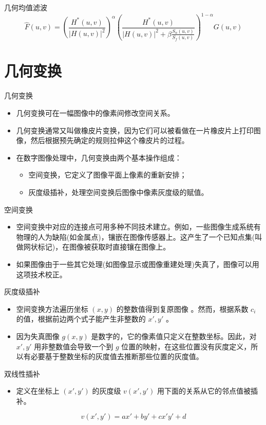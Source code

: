\documentclass[presentation]{beamer}
\begin{document}
\begin{frame}[label={sec:org3183fc2}]{几何均值滤波}
\[ \hat F(u,v) =\left(\frac{H^{*}(u,v)}{|H(u,v)|^2}\right)^{\alpha}\left(\frac{H^{ *}(u,v)}{|H(u,v)|^2+\beta \frac{S_n(u,v)}{S_f(u,v)}}\right)^{1-\alpha}G(u,v) \]
\end{frame}

\section{几何变换}
\label{sec:org457576d}
\begin{frame}[label={sec:org7e2612c}]{几何变换}
\begin{itemize}
\item 几何变换可在一幅图像中的像素间修改空间关系。
\item 几何变换通常又叫做橡皮片变换，因为它们可以被看做在一片橡皮片上打印图像，然后根据预先确定的规则拉伸这个橡皮片的过程。
\item 在数字图像处理中，几何变换由两个基本操作组成：
\begin{itemize}
\item 空间变换，它定义了图像平面上像素的重新安排；
\item 灰度级插补，处理空间变换后图像中像素灰度级的赋值。
\end{itemize}
\end{itemize}
\end{frame}

\begin{frame}[label={sec:org503f0c9}]{空间变换}
\begin{itemize}
\item 空间变换中对应的连接点可用多种不同技术建立。例如，一些图像生成系统有物理的人为缺陷(如金属点)，镶嵌在图像传感器上。这产生了一个已知点集(叫做网状标记)，在图像被获取时直接镶在图像上。
\item 如果图像由于一些其它处理(如图像显示或图像重建处理)失真了，图像可以用这项技术校正。
\end{itemize}
\end{frame}

\begin{frame}[label={sec:org50d52b2}]{灰度级插补}
\begin{itemize}
\item 空间变换方法遍历坐标 \((x,y)\) 的整数值得到复原图像 。然而，根据系数 \(c_i\) 的值，根据前边两个式子能产生非整数的 \(x',y'\) 。
\item 因为失真图像 \(g(x,y)\) 是数字的，它的像素值只定义在整数坐标。因此，对 \(x',y'\) 用非整数值会导致一个到 \(g\) 位置的映射，在这些位置没有灰度定义，所以有必要基于整数坐标的灰度值去推断那些位置的灰度值。
\end{itemize}
\end{frame}

\begin{frame}[label={sec:org4f02b9d}]{双线性插补}
\begin{itemize}
\item 定义在坐标上 \((x',y')\) 的灰度级 \(v(x',y')\) 用下面的关系从它的邻点值被插补。
\end{itemize}

\[ v(x',y')=a x'+by'+cx'y'+d \]
\end{frame}
\end{document}
